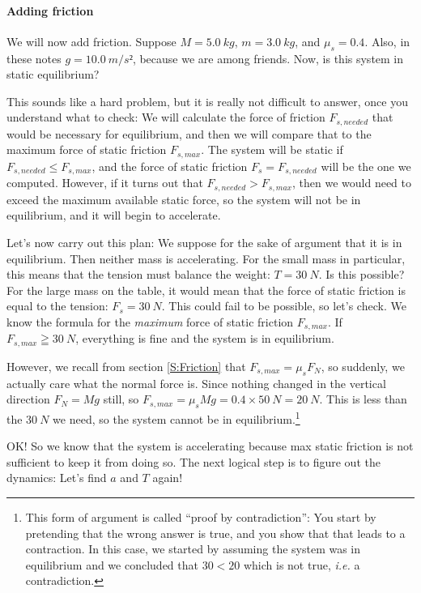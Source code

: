 \paragraph{Adding friction}
We will now add friction. Suppose $M=5.0\ kg$, $m=3.0\ kg$, and $μ_s = 0.4$. Also, in these notes $g = 10.0\ m/s²$, because we are among friends. Now, is this system in static equilibrium?

This sounds like a hard problem, but it is really not difficult to answer, once you understand what to check: We will calculate the force of friction $F_{s,needed}$ that would be necessary for equilibrium, and then we will compare that to the maximum force of static friction $F_{s,max}$. The system will be static if $F_{s,needed} ≤ F_{s,max}$, and the force of static friction $F_s =F_{s,needed}$ will be the one we computed. However, if it turns out that $F_{s,needed} > F_{s,max}$, then we would need to exceed the maximum available static force, so the system will not be in equilibrium, and it will begin to accelerate.

Let's now carry out this plan: We suppose for the sake of argument that it is in equilibrium. Then neither mass is accelerating. For the small mass in particular, this means that the tension must balance the weight: $T= 30\ N$. Is this possible? For the large mass on the table, it would mean that the force of static friction is equal to the tension: $F_s = 30\ N$. This could fail to be possible, so let's check. We know the formula for the {\em maximum} force of static friction $F_{s,max}$. If $F_{s,max} ≧  30\ N$, everything is fine and the system is in equilibrium. 

However, we recall from section \ref{S:Friction} that $F_{s,max} = μ_s F_N$, so suddenly, we actually care what the normal force is. Since nothing changed in the vertical direction $F_N=Mg$ still, so $F_{s,max} = μ_s Mg = 0.4 × 50\ N = 20\ N$. This is less than the $30\ N$ we need, so the system cannot be in equilibrium.\footnote{This form of argument is called “proof by contradiction”: You start by pretending that the wrong answer is true, and you show that that leads to a contraction. In this case, we started by assuming the system was in equilibrium and we concluded that $30 < 20$ which is not true, {\it i.e.} a contradiction.}

OK! So we know that the system is accelerating because max static friction is not sufficient to keep it from doing so. The next logical step is to figure out the dynamics: Let's find $a$ and $T$ again!


